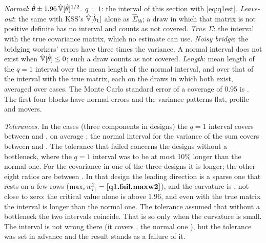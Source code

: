\begin{table}[t]\centering\footnotesize\setlength{\tabcolsep}{4.5pt}
\caption{Coverage of 95\% intervals with a bottleneck of $b$ bridging workers ( draws per design;
ranges over designs and over $\hat\sigma^2_\alpha$, $\hat\sigma^2_\psi$, $\hat\sigma_{\alpha,\psi}$)}\label{tab:q1}
\begin{minipage}{0.97\textwidth}\footnotesize\smallskip
\emph{Normal}: $\hat\theta\pm1.96\,\hat{\mathbb{V}}[\hat\theta]^{1/2}$. \emph{$q=1$}: the interval of this section with
\eqref{eq:q1est}. \emph{Leave-out}: the same with KSS's $\hat{\mathbb{V}}[\hat b_1]$ alone as $\hat\Sigma_{bb}$; a draw in which
that matrix is not positive definite has no interval and counts as not covered. \emph{True $\Sigma$}: the interval
with the true covariance matrix, which no estimate can use. \emph{Noisy bridge}: the bridging workers' errors
have three times the variance. A normal interval does not exist when $\hat{\mathbb{V}}[\hat\theta]\le0$; such a draw counts
as not covered. \emph{Length}: mean length of the $q=1$ interval over the mean length of the
normal interval, and over that of the interval with the true matrix, each on the draws in which both exist,
averaged over cases. The Monte Carlo standard error of a coverage of 0.95
is . The first four blocks have normal errors and the variance patterns flat, profile and movers.
\end{minipage}
\end{table}

\emph{Tolerances.} In the  cases (three components in  designs) the $q=1$ interval
covers between  and , on average ; the normal interval for the
variance of the sum covers between  and . The tolerance that failed concerns the
designs without a bottleneck, where the $q=1$ interval was to be at most 10\% longer than the normal one. For
the covariance in one of the three designs it is  longer; the other eight ratios are between
. In that design the leading direction is a sparse one that rests on a few rows
($\max_iw_{i1}^2=\R{q1.fail.maxw2}$), and the curvature is , not close to zero: the critical value
alone is  above 1.96, and even with the true matrix the interval is  longer than
the normal one. The tolerance assumed that without a bottleneck the two intervals coincide. That is so only
when the curvature is small. The interval is not wrong there (it covers , the normal one
), but the tolerance was set in advance and the result stands as a failure of it.


